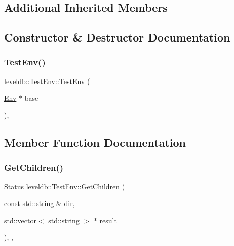 \subsection*{Additional Inherited Members}


\subsection{Constructor \& Destructor Documentation}
\mbox{\label{classleveldb_1_1_test_env_ae8ebf0e06a16ac38b4004659f7f647fa}} 
\subsubsection{\texorpdfstring{TestEnv()}{TestEnv()}}
{\footnotesize\ttfamily leveldb\+::\+Test\+Env\+::\+Test\+Env (\begin{DoxyParamCaption}\item[{\mbox{\hyperlink{classleveldb_1_1_env}{Env}} $\ast$}]{base }\end{DoxyParamCaption})\hspace{0.3cm}{\ttfamily [inline]}, {\ttfamily [explicit]}}



\subsection{Member Function Documentation}
\mbox{\label{classleveldb_1_1_test_env_ac0ab9af039ce4ca277c3df2b437821a7}} 
\subsubsection{\texorpdfstring{GetChildren()}{GetChildren()}}
{\footnotesize\ttfamily \mbox{\hyperlink{classleveldb_1_1_status}{Status}} leveldb\+::\+Test\+Env\+::\+Get\+Children (\begin{DoxyParamCaption}\item[{const std\+::string \&}]{dir,  }\item[{std\+::vector$<$ std\+::string $>$ $\ast$}]{result }\end{DoxyParamCaption})\hspace{0.3cm}{\ttfamily [inline]}, {\ttfamily [override]}, {\ttfamily [virtual]}}



